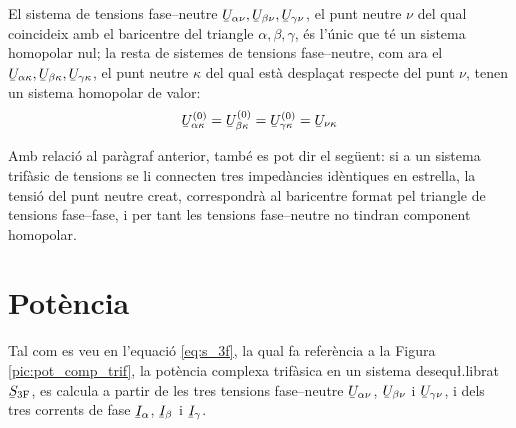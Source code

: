 El sistema de tensions fase--neutre
$\cmplx{U}_{\alpha\nu},\cmplx{U}_{\beta\nu},\cmplx{U}_{\gamma\nu}$,
el punt neutre $\nu$ del qual coincideix amb el baricentre del
triangle $\alpha, \beta,
 \gamma$, \'{e}s l'\'{u}nic que t\'{e} un sistema homopolar nul; la resta de sistemes de tensions
 fase--neutre, com ara el $\cmplx{U}_{\alpha\kappa},\cmplx{U}_{\beta\kappa},\cmplx{U}_{\gamma\kappa}$,
 el punt neutre $\kappa$ del qual est\`{a} despla\c{c}at respecte del punt $\nu$, tenen un sistema
 homopolar de valor:
\begin{equation}
    \cmplx{U}_{\alpha\kappa}\ap{(0)} = \cmplx{U}_{\beta\kappa}\ap{(0)} =
    \cmplx{U}_{\gamma\kappa}\ap{(0)} = \cmplx{U}_{\nu\kappa}
\end{equation}

Amb relaci\'{o} al par\`{a}graf anterior, tamb\'{e} es pot dir el seg\"{u}ent: si a
un sistema trif\`{a}sic de tensions se li connecten tres imped\`{a}ncies
id\`{e}ntiques en estrella, la tensi\'{o} del punt neutre creat,
correspondr\`{a} al baricentre format pel triangle de tensions
fase--fase, i per tant les tensions fase--neutre no tindran
component homopolar.

\section{Pot\`{e}ncia} 

Tal com es veu en l'equaci\'{o} \eqref{eq:s_3f}, la qual fa refer\`{e}ncia a
la Figura \vref{pic:pot_comp_trif}, la pot\`{e}ncia complexa trif\`{a}sica
en un sistema desequ{\l.l}ibrat $\cmplx{S}\ped{3F}$, es calcula a
partir de les tres tensions fase--neutre $\cmplx{U}_{\alpha\nu}$,
$\cmplx{U}_{\beta\nu}$ i $\cmplx{U}_{\gamma\nu}$, i dels tres
corrents de fase $\cmplx{I}_\alpha$, $\cmplx{I}_\beta$ i
$\cmplx{I}_\gamma$.


